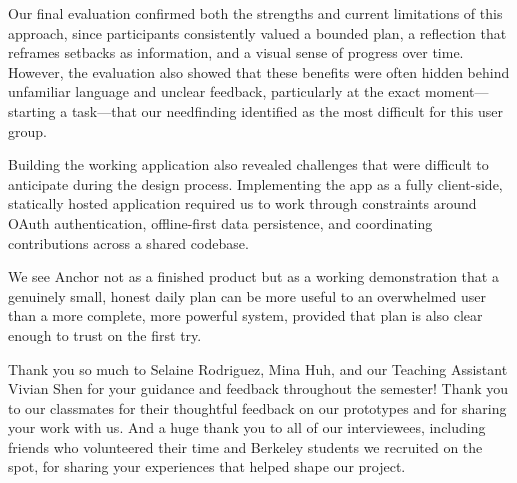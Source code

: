 \documentclass[sigplan,screen]{acmart}
\begin{document}
Our final evaluation confirmed both the strengths and current limitations of this approach, since participants consistently valued a bounded plan, a reflection that reframes setbacks as information, and a visual sense of progress over time. However, the evaluation also showed that these benefits were often hidden behind unfamiliar language and unclear feedback, particularly at the exact moment—starting a task—that our needfinding identified as the most difficult for this user group.

Building the working application also revealed challenges that were difficult to anticipate during the design process. Implementing the app as a fully client-side, statically hosted application required us to work through constraints around OAuth authentication, offline-first data persistence, and coordinating contributions across a shared codebase.

We see Anchor not as a finished product but as a working demonstration that a genuinely small, honest daily plan can be more useful to an overwhelmed user than a more complete, more powerful system, provided that plan is also clear enough to trust on the first try.

\begin{acks}
Thank you so much to Selaine Rodriguez, Mina Huh, and our Teaching Assistant Vivian Shen for your guidance and feedback throughout the semester! Thank you to our classmates for their thoughtful feedback on our prototypes and for sharing your work with us. And a huge thank you to all of our interviewees, including friends who volunteered their time and Berkeley students we recruited on the spot, for sharing your experiences that helped shape our project.
\end{acks}

\end{document}
